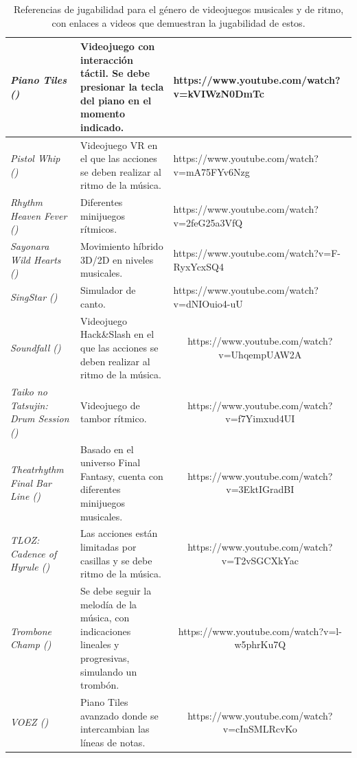 \begin{table}[htbp]
{\begin{tabular}{|l||l||c|}
		\hline
		\textit{Piano Tiles (\cite{PIANOTILES:2014})} & Videojuego con interacción táctil. Se debe presionar la tecla del piano en el momento indicado. & \multicolumn{1}{l|}{\textcolor[rgb]{ .02,  .388,  .757}{https://www.youtube.com/watch?v=kVIWzN0DmTc}} \\
		\hline
		\textit{Pistol Whip (\cite{PISTOLWHIP:2019})} & Videojuego VR en el que las acciones se deben realizar al ritmo de la música. & \multicolumn{1}{l|}{\textcolor[rgb]{ .02,  .388,  .757}{https://www.youtube.com/watch?v=mA75FYv6Nzg}} \\
		\hline
		\textit{Rhythm Heaven Fever (\cite{RHF:2011})} & Diferentes minijuegos rítmicos. & \multicolumn{1}{l|}{\textcolor[rgb]{ .02,  .388,  .757}{https://www.youtube.com/watch?v=2feG25a3VfQ}} \\
		\hline
		\textit{Sayonara Wild Hearts (\cite{SWH:2019})} & Movimiento híbrido 3D/2D en niveles musicales. & \multicolumn{1}{l|}{\textcolor[rgb]{ .02,  .388,  .757}{https://www.youtube.com/watch?v=F-RyxYcxSQ4}} \\
		\hline
		\textit{SingStar (\cite{SINGSTAR:2004})} & Simulador de canto. & \multicolumn{1}{l|}{\textcolor[rgb]{ .02,  .388,  .757}{https://www.youtube.com/watch?v=dNIOuio4-uU}} \\
		\hline
		\textit{Soundfall (\cite{SOUNDFALL:2022})} & Videojuego Hack\&Slash en el que las acciones se deben realizar al ritmo de la música. & \textcolor[rgb]{ .02,  .388,  .757}{https://www.youtube.com/watch?v=UhqempUAW2A} \\
		\hline
		\textit{Taiko no Tatsujin: Drum Session (\cite{TNTDS:2017})} & Videojuego de tambor rítmico. & \textcolor[rgb]{ .02,  .388,  .757}{https://www.youtube.com/watch?v=f7Yimxud4UI} \\
		\hline
		\textit{Theatrhythm Final Bar Line (\cite{TFBL:2023})} & Basado en el universo Final Fantasy, cuenta con diferentes minijuegos musicales. & \textcolor[rgb]{ .02,  .388,  .757}{https://www.youtube.com/watch?v=3EktIGradBI} \\
		\hline
		\textit{TLOZ: Cadence of Hyrule (\cite{TLOZCOH:2019})} & Las acciones están limitadas por casillas y se debe ritmo de la música. & \textcolor[rgb]{ .02,  .388,  .757}{https://www.youtube.com/watch?v=T2vSGCXkYac} \\
		\hline
		\textit{Trombone Champ (\cite{TROMBONECHAMP:2022})} & Se debe seguir la melodía de la música, con indicaciones lineales y progresivas, simulando un trombón. & \textcolor[rgb]{ .02,  .388,  .757}{https://www.youtube.com/watch?v=l-w5phrKu7Q} \\
		\hline
		\textit{VOEZ (\cite{VOEZ:2016})} & Piano Tiles avanzado donde se intercambian las líneas de notas. & \textcolor[rgb]{ .02,  .388,  .757}{https://www.youtube.com/watch?v=cInSMLRcvKo} \\
		\hline
	\end{tabular}
}
	\caption{Referencias de jugabilidad para el género de videojuegos musicales y de ritmo, con enlaces a videos que demuestran la jugabilidad de estos.}
	\label{tab:RhythmReferences}
\end{table}

